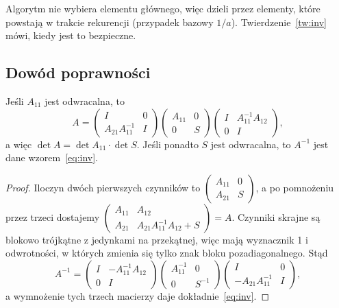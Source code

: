 Algorytm nie wybiera elementu głównego, więc dzieli przez elementy, które powstają w trakcie rekurencji
(przypadek bazowy $1/a$). Twierdzenie~\ref{tw:inv} mówi, kiedy jest to bezpieczne.

\subsection{Dowód poprawności}
\begin{lem}\label{lem:schur}
Jeśli $A_{11}$ jest odwracalna, to
\[
A=\begin{pmatrix}I&0\\A_{21}A_{11}^{-1}&I\end{pmatrix}
  \begin{pmatrix}A_{11}&0\\0&S\end{pmatrix}
  \begin{pmatrix}I&A_{11}^{-1}A_{12}\\0&I\end{pmatrix},
\]
a więc $\det A=\det A_{11}\cdot\det S$. Jeśli ponadto $S$ jest odwracalna, to $A^{-1}$ jest dane wzorem~\eqref{eq:inv}.
\end{lem}
\begin{proof}
Iloczyn dwóch pierwszych czynników to $\begin{pmatrix}A_{11}&0\\A_{21}&S\end{pmatrix}$, a po pomnożeniu przez trzeci
dostajemy $\begin{pmatrix}A_{11}&A_{12}\\A_{21}&A_{21}A_{11}^{-1}A_{12}+S\end{pmatrix}=A$. Czynniki skrajne są blokowo
trójkątne z jedynkami na przekątnej, więc mają wyznacznik 1 i odwrotności, w których zmienia się tylko znak bloku
pozadiagonalnego. Stąd
\[
A^{-1}=\begin{pmatrix}I&-A_{11}^{-1}A_{12}\\0&I\end{pmatrix}
       \begin{pmatrix}A_{11}^{-1}&0\\0&S^{-1}\end{pmatrix}
       \begin{pmatrix}I&0\\-A_{21}A_{11}^{-1}&I\end{pmatrix},
\]
a wymnożenie tych trzech macierzy daje dokładnie~\eqref{eq:inv}.
\end{proof}

